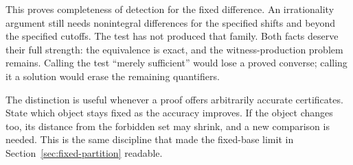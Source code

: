 This proves completeness of detection for the fixed difference. An irrationality
argument still needs nonintegral differences for the specified shifts and beyond
the specified cutoffs. The test has not produced that family. Both facts deserve
their full strength: the equivalence is exact, and the witness-production problem
remains. Calling the test ``merely sufficient'' would lose a proved converse;
calling it a solution would erase the remaining quantifiers.

The distinction is useful whenever a proof offers arbitrarily accurate
certificates. State which object stays fixed as the accuracy improves. If the
object changes too, its distance from the forbidden set may shrink, and a new
comparison is needed. This is the same discipline that made the fixed-base
limit in Section~\ref{sec:fixed-partition} readable.
